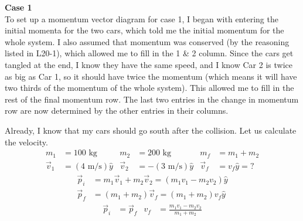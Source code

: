 \documentclass[]{article}
\begin{document}
\begin{TeacherMargin}
\noindent\textbf{Case 1} \\
To set up a momentum vector diagram for case 1, I began with entering the initial momenta for the two cars, which told me the initial momentum for the whole system. I also assumed that momentum was conserved (by the reasoning listed in L20-1), which allowed me to fill in the 1 \& 2 column. Since the cars get tangled at the end, I know they have the same speed, and I know Car 2 is twice as big as Car 1, so it should have twice the momentum (which means it will have two thirds of the momentum of the whole system). This allowed me to fill in the rest of the final momentum row. The last two entries in the change in momentum row are now determined by the other entries in their columns.
\begin{center}
	\Large
\end{center}
Already, I know that my cars should go south after the collision. Let us calculate the velocity.
\begin{align*}
	m_{1} & = 100\text{ kg} & m_{2} & = 200\text{ kg} & m_{f} & = m_{1}+m_{2} \\
	\vec{v}_{1} & = (4\text{ m/s})\hat{y} & \vec{v}_{2} & = -(3\text{ m/s})\hat{y} & \vec{v}_{f} & = v_{f}\hat{y} = ?
\end{align*}
\begin{align*}
	\vec{p}_{i} & = m_{1}\vec{v}_{1} + m_{2}\vec{v}_{2} = (m_{1}v_{1}-m_{2}v_{2})\hat{y} \\
	\vec{p}_{f} & = (m_{1} + m_{2})\vec{v}_{f} = (m_{1}+m_{2})v_{f}\hat{y}
\end{align*}
\begin{align*}
	\vec{p}_{i} & = \vec{p}_{f} & v_{f} & = \frac{m_{1}v_{1}-m_{2}v_{2}}{m_{1}+m_{2}} \\

\end{align*}
\end{TeacherMargin}
\end{document}
